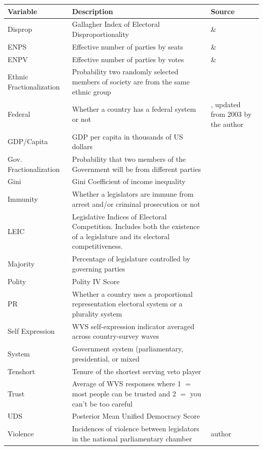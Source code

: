 \documentclass[a4paper]{article}\usepackage{graphicx, color}
\begin{document}
{{\begin{table}[!h]
\begin{center}
\begin{tabular}{l m{7cm} m{3.5cm}}
            \hline
            Variable & Description & Source \\
            \hline \hline
            Disprop & Gallagher Index of Electoral Disproportionality & \cite{Gallagher2012} \& \cite{Carey2011} \\
            ENPS & Effective number of parties by seats & \cite{Gallagher2012} \& \cite{Carey2011} \\
            ENPV & Effective number of parties by votes & \cite{Gallagher2012} \& \cite{Carey2011} \\
            Ethnic Fractionalization & Probability two randomly selected members of society are from the same ethnic group & \cite{Alesina2003} \\
            Federal & Whether a country has a federal system or not & \cite{Carey2011}, updated from 2003 by the author \\           
            GDP/Capita & GDP per capita in thousands of US dollars & \cite{WorldBank2011} \\
            Gov. Fractionalization & Probability that two members of the Government will be from different parties & \cite{DPI2001} \\
            Gini & Gini Coefficient of income inequality & \cite{UNU2008} \\
            Immunity & Whether a legislators are immune from arrest and/or criminal prosecution or not & \cite{Fish2009} \\
            LEIC & Legislative Indices of Electoral Competition. Includes both the existence of a legislature and its electoral competitiveness. & \cite{DPI2001} \\
            Majority & Percentage of legislature controlled by governing parties & \cite{DPI2001} \\
            Polity & Polity IV Score & \cite{Marshall2009} \\
            PR & Whether a country uses a proportional representation electoral system or a plurality system & \cite{DPI2001} \\
            Self Expression & WVS self-expression indicator averaged across country-survey waves & \cite{WVS2009} \\
            System & Government system (parliamentary, presidential, or mixed & \cite{DPI2001} \\
            Tenshort & Tenure of the shortest serving veto player & \cite{DPI2001} \\
            Trust & Average of WVS responses where 1 $=$ most people can be trusted and 2 $=$ you can't be too careful & \cite{WVS2009} \\
            UDS & Posterior Mean Unified Democracy Score & \cite{Pemstein2010} \\
            Violence & Incidences of violence between legislators in the national parliamentary chamber & author \\
            \hline


\end{tabular}
\end{center}
\end{table}}}
\end{document}
